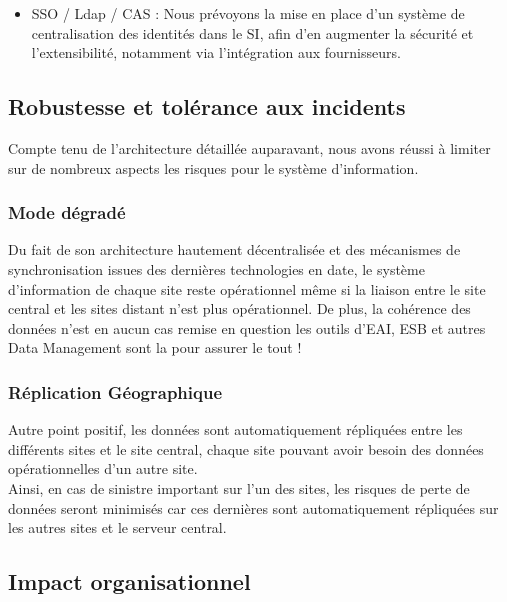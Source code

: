 \begin{itemize}
\item SSO / Ldap / CAS : Nous prévoyons la mise en place d'un système de centralisation des identités dans le SI, afin d'en augmenter la sécurité et l'extensibilité, notamment via l'intégration aux fournisseurs.
\end{itemize}

\subsection{Robustesse et tolérance aux incidents}

Compte tenu de l'architecture détaillée auparavant, nous avons réussi à limiter sur de nombreux aspects les risques pour le système d'information.\\

\subsubsection{Mode dégradé}

Du fait de son architecture hautement décentralisée et des mécanismes de synchronisation issues des dernières technologies en date, le système d'information de chaque site reste opérationnel même si la liaison entre le site central et les sites distant n'est plus opérationnel. De plus, la cohérence des données n'est en aucun cas remise en question les outils d'EAI, ESB et autres Data Management sont la pour assurer le tout !

\subsubsection{Réplication Géographique}
Autre point positif, les données sont automatiquement répliquées entre les différents sites et le site central, chaque site pouvant avoir besoin des données opérationnelles d'un autre site.\\
Ainsi, en cas de sinistre important sur l'un des sites, les risques de perte de données seront minimisés car ces dernières sont automatiquement répliquées sur les autres sites et le serveur central.

\subsection{Impact organisationnel}

